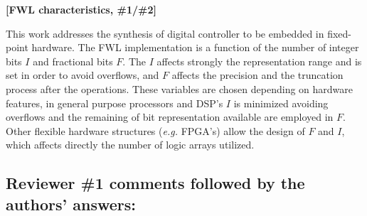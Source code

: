 \documentclass[11pt]{article}
\newcommand\vi{\vspace{\baselineskip}}
\begin{document}
\setcounter{page}{1}
\thispagestyle{empty}

\vspace*{1cm}


\noindent [Novelty, \#1/\#2]

\noindent \textbf{[FWL characteristics, \#1/\#2]}

\noindent This work addresses the synthesis of digital controller to be embedded in fixed-point hardware. The FWL implementation is a function of the number of integer bits $I$ and fractional bits $F$. The $I$ affects strongly the representation range and is set in order to avoid overflows, and $F$ affects the precision and the truncation process after the operations. These variables are chosen depending on hardware features, in general purpose processors and DSP's $I$ is minimized avoiding overflows and the remaining of bit representation available are employed in $F$. Other flexible hardware structures (\textit{e.g.} FPGA's) allow the design of $F$ and $I$, which affects directly the number of logic arrays utilized.




\newpage

\vi
\subsection*{Reviewer \#1 comments followed by the authors' answers:}
\end{document}
